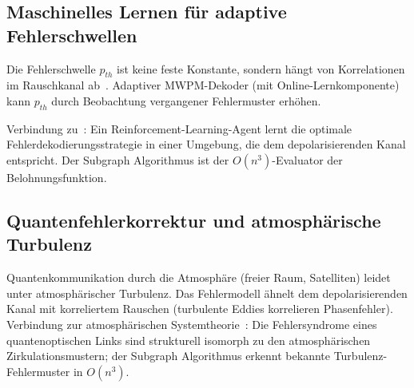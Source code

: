 ﻿\documentclass[a4paper,12pt]{article}
\theoremstyle{definition}
\begin{document}
\subsection{Maschinelles Lernen f\"ur adaptive Fehlerschwellen}

Die Fehlerschwelle $p_{th}$ ist keine feste Konstante, sondern h\"angt von
Korrelationen im Rauschkanal ab~\cite{tuckett2018}. Adaptiver MWPM-Dekoder
(mit Online-Lernkomponente) kann $p_{th}$ durch Beobachtung vergangener
Fehlermuster erh\"ohen.

Verbindung zu~\cite{epp2026hetnet}: Ein Reinforcement-Learning-Agent lernt
die optimale Fehlerdekodierungsstrategie in einer Umgebung, die dem
depolarisierenden Kanal entspricht. Der Subgraph Algorithmus ist der
$O(n^3)$-Evaluator der Belohnungsfunktion.

\subsection{Quantenfehlerkorrektur und atmosph\"arische Turbulenz}

Quantenkommunikation durch die Atmosph\"are (freier Raum, Satelliten) leidet
unter atmosph\"arischer Turbulenz. Das Fehlermodell \"ahnelt dem depolarisierenden
Kanal mit korreliertem Rauschen (turbulente Eddies korrelieren Phasenfehler).
Verbindung zur atmosph\"arischen Systemtheorie~\cite{epp2026klima}: Die
Fehlersyndrome eines quantenoptischen Links sind strukturell isomorph zu den
atmosph\"arischen Zirkulationsmustern; der Subgraph Algorithmus erkennt
bekannte Turbulenz-Fehlermuster in $O(n^3)$.
\end{document}
